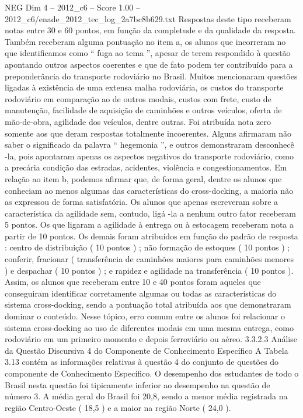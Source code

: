 \begin{textsample}{NEG Dim 4 – 2012\_c6 – Score 1.00 – 2012\_c6/enade\_2012\_tec\_log\_2a7bc8b629.txt}
Respostas deste tipo receberam notas entre 30 e 60 pontos, em função da completude e da qualidade da resposta.
Também receberam alguma pontuação no item a, os alunos que incorreram no que identificamos como “ fuga ao tema ”, apesar de terem respondido à questão apontando outros aspectos coerentes e que de fato podem ter contribuído para a preponderância do transporte rodoviário no Brasil.
Muitos mencionaram questões ligadas à existência de uma extensa malha rodoviária, os custos do transporte rodoviário em comparação ao de outros modais, custos com frete, custo de manutenção, facilidade de aquisição de caminhões e outros veículos, oferta de mão-de-obra, agilidade dos veículos, dentre outras.
Foi atribuída nota zero somente aos que deram respostas totalmente incoerentes.
Alguns afirmaram não saber o significado da palavra “ hegemonia ”, e outros demonstraram desconhecê -la, pois apontaram apenas os aspectos negativos do transporte rodoviário, como a precária condição das estradas, acidentes, violência e congestionamentos.
Em relação ao item b, podemos afirmar que, de forma geral, dentre os alunos que conheciam ao menos algumas das características do cross-docking, a maioria não as expressou de forma satisfatória.
Os alunos que apenas escreveram sobre a característica da agilidade sem, contudo, ligá -la a nenhum outro fator receberam 5 pontos.
Os que ligaram a agilidade à entrega ou à estocagem receberam nota a partir de 10 pontos.
Os demais foram atribuídos em função do padrão de resposta : centro de distribuição ( 10 pontos ) ; não formação de estoques ( 10 pontos ) ; conferir, fracionar ( transferência de caminhões maiores para caminhões menores ) e despachar ( 10 pontos ) ; e rapidez e agilidade na transferência ( 10 pontos ).
Assim, os alunos que receberam entre 10 e 40 pontos foram aqueles que conseguiram identificar corretamente algumas ou todas as características do sistema cross-docking, sendo a pontuação total atribuída aos que demonstraram dominar o conteúdo.
Nesse tópico, erro comum entre os alunos foi relacionar o sistema cross-docking ao uso de diferentes modais em uma mesma entrega, como rodoviário em um primeiro momento e depois ferroviário ou aéreo. 3.3.2.3 Análise da Questão Discursiva 4 do Componente de Conhecimento Específico A Tabela 3.13 contém as informações relativas à questão 4 do conjunto de questões do componente de Conhecimento Específico.
O desempenho dos estudantes de todo o Brasil nesta questão foi tipicamente inferior ao desempenho na questão de número 3.
A média geral do Brasil foi 20,8, sendo a menor média registrada na região Centro-Oeste ( 18,5 ) e a maior na região Norte ( 24,0 ).

\end{textsample}
